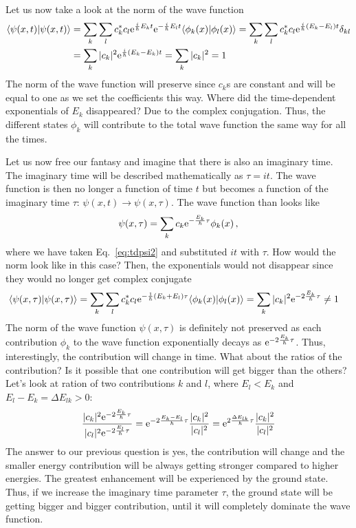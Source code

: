 Let us now take a look at the norm of the wave function
\begin{align}
    \langle\psi(x,t)|\psi(x,t)\rangle &= \sum_k \sum_l c_k^* c_l  \mathrm{e}^{\frac{i}{\hbar}E_k t} \mathrm{e}^{-\frac{i}{\hbar}E_l t} \langle\phi_k(x)|\phi_l(x)\rangle = \sum_k \sum_l c_k^* c_l  \mathrm{e}^{\frac{i}{\hbar}(E_k - E_l) t} \delta_{kl} \notag \\
    &= \sum_k |c_k|^2  \mathrm{e}^{\frac{i}{\hbar}(E_k - E_k) t} =  \sum_k |c_k|^2 = 1
\end{align}
The norm of the wave function will preserve since $c_k$s are constant and will be equal to one as we set the coefficients this way. Where did the time-dependent exponentials of $E_k$ disappeared? Due to the complex conjugation. Thus, the different states $\phi_k$ will contribute to the total wave function the same way for all the times. 

Let us now free our fantasy and imagine that there is also an imaginary time. The imaginary time will be described mathematically as $\tau=it$. The wave function is then no longer a function of time $t$ but becomes a function of the imaginary time $\tau$: $\psi(x,t) \rightarrow \psi(x,\tau)$. The wave function than looks like
\begin{equation}
    \psi(x,\tau) = \sum_k c_k \mathrm{e}^{-\frac{E_k}{\hbar}\tau}\phi_k(x) \, ,
\end{equation}
where we have taken Eq.~\eqref{eq:tdpsi2} and substituted $it$ with $\tau$.
How would the norm look like in this case? Then, the exponentials would not disappear since they would no longer get complex conjugate
\begin{align}
    \langle\psi(x,\tau)|\psi(x,\tau)\rangle &= \sum_k \sum_l c_k^* c_l  \mathrm{e}^{-\frac{1}{\hbar}(E_k + E_l) \tau} \langle\phi_k(x)|\phi_l(x)\rangle =\sum_k |c_k|^2  \mathrm{e}^{-2\frac{E_k}{\hbar} \tau} \neq 1
\end{align}
The norm of the wave function $\psi(x,\tau)$ is definitely not preserved as each contribution $\phi_k$ to the wave function exponentially decays as $\mathrm{e}^{-2\frac{E_k}{\hbar} \tau}$.
Thus, interestingly, the contribution will change in time. What about the ratios of the contribution? Is it possible that one contribution will get bigger than the others? Let's look at ration of two contributions $k$ and $l$, where $E_l < E_k$ and $E_l - E_k = \Delta E_{lk} > 0$:
\begin{equation}
    \frac{|c_k|^2  \mathrm{e}^{-2\frac{E_k}{\hbar}\tau}}{|c_l|^2  \mathrm{e}^{-2\frac{E_l}{\hbar}\tau}} =  \mathrm{e}^{-2\frac{E_k - E_l}{\hbar}\tau} \frac{|c_k|^2}{|c_l|^2}  = \mathrm{e}^{2\frac{\Delta E_{lk}}{\hbar}\tau} \frac{|c_k|^2}{|c_l|^2}
\end{equation}
The answer to our previous question is yes, the contribution will change and the smaller energy contribution will be always getting stronger compared to higher energies. The greatest enhancement will be experienced by the ground state. Thus, if we increase the imaginary time parameter $\tau$, the ground state will be getting bigger and bigger contribution, until it will completely dominate the wave function.

